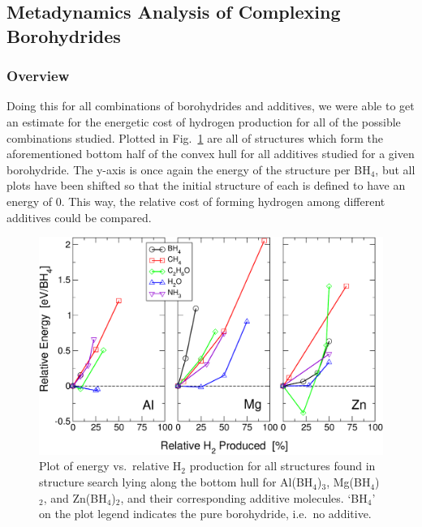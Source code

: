 \documentclass[twocolumn, prb, showpacs]{revtex4-1}
\begin{document}
\subsection{Metadynamics Analysis of Complexing Borohydrides}
\label{sec:metadynamics}

\subsubsection{Overview}

Doing this for all combinations of borohydrides and additives, we were able to
get an estimate for the energetic cost of hydrogen production for all of the
possible combinations studied. Plotted in Fig.~\ref{fig:main_plot} are all of
structures which form the aforementioned bottom half of the convex hull for all
additives studied for a given borohydride. The y-axis is once again the energy
of the structure per BH$_4$, but all plots have been shifted so that the initial
structure of each is defined to have an energy of 0. This way, the relative
cost of forming hydrogen among different additives could be compared.


\begin{figure}
\includegraphics[width=\columnwidth]{H2_production}
\caption{\label{fig:main_plot}Plot of energy vs.\ relative H$_2$ production for all structures
found in structure search
lying along the bottom hull for Al(BH$_4$)$_3$, Mg(BH$_4$)$_2$, and Zn(BH$_4$)$_2$, and their corresponding additive molecules. `BH$_4$' on the plot legend indicates the pure
borohydride, i.e.\ no additive.}
\end{figure}
\end{document}

